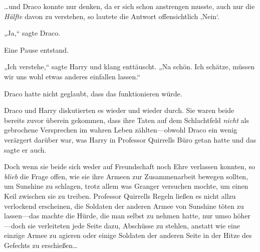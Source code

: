 …und Draco konnte nur denken, da er sich schon anstrengen musste, auch nur die \emph{Hälfte} davon zu verstehen, so lautete die Antwort offensichtlich ‚Nein‘.

„Ja,“ sagte Draco.

Eine Pause entstand.

„Ich verstehe,“ sagte Harry und klang enttäuscht. „Na schön. Ich schätze, müssen wir uns wohl etwas anderes einfallen lassen.“

Draco hatte nicht geglaubt, dass das funktionieren würde.

Draco und Harry diskutierten es wieder und wieder durch. Sie waren beide bereits zuvor überein gekommen, dass ihre Taten auf dem Schlachtfeld \emph{nicht} als gebrochene Versprechen im wahren Leben zählten—obwohl Draco ein wenig verärgert darüber war, was Harry in Professor Quirrells Büro getan hatte und das sagte er auch.

Doch wenn sie beide sich weder auf Freundschaft noch Ehre verlassen konnten, so \emph{blieb} die Frage offen, wie sie ihre Armeen zur Zusammenarbeit bewegen sollten, um Sunshine zu schlagen, trotz allem was Granger versuchen mochte, um einen Keil zwischen sie zu treiben. Professor Quirrells Regeln ließen es nicht allzu verlockend erscheinen, die Soldaten der anderen Armee von Sunshine töten zu lassen—das machte die Hürde, die man selbst zu nehmen hatte, nur umso höher—doch sie verleiteten jede Seite dazu, Abschüsse zu stehlen, anstatt wie eine einzige Armee zu agieren oder einige Soldaten der anderen Seite in der Hitze des Gefechts zu erschießen…

